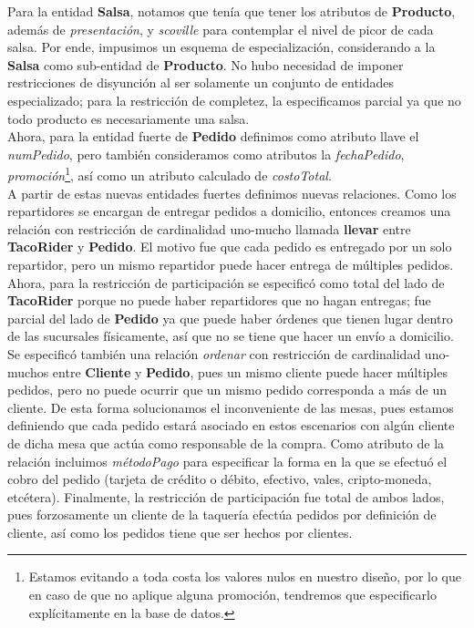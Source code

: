 \documentclass[11pt,letterpaper]{article}
\begin{document}
Para la entidad \textbf{Salsa}, notamos que tenía que tener los atributos de \textbf{Producto}, además de \textit{presentación}, y \textit{scoville} para contemplar el nivel de picor de cada salsa. Por ende, impusimos un esquema de especialización, considerando a la \textbf{Salsa} como sub-entidad de \textbf{Producto}. No hubo necesidad de imponer restricciones de disyunción al ser solamente un conjunto de entidades especializado; para la restricción de completez, la especificamos parcial ya que no todo producto es necesariamente una salsa.\\

Ahora, para la entidad fuerte de \textbf{Pedido} definimos como atributo llave el \textit{numPedido}, pero también consideramos como atributos la \textit{fechaPedido}, \textit{promoción}\footnote{Estamos evitando a toda costa los valores nulos en nuestro diseño, por lo que en caso de que no aplique alguna promoción, tendremos que especificarlo explícitamente en la base de datos.}, así como un atributo calculado de \textit{costoTotal}. \\

A partir de estas nuevas entidades fuertes definimos nuevas relaciones. Como los repartidores se encargan de entregar pedidos a domicilio, entonces creamos una relación con restricción de cardinalidad uno-mucho llamada \textbf{llevar} entre \textbf{TacoRider} y \textbf{Pedido}. El motivo fue que cada pedido es entregado por un solo repartidor, pero un mismo repartidor puede hacer entrega de múltiples pedidos. Ahora, para la restricción de participación se especificó como total del lado de \textbf{TacoRider} porque no puede haber repartidores que no hagan entregas; fue parcial del lado de \textbf{Pedido} ya que puede haber órdenes que tienen lugar dentro de las sucursales físicamente, así que no se tiene que hacer un envío a domicilio.\\

Se especificó también una relación \textit{ordenar} con restricción de cardinalidad uno-muchos entre \textbf{Cliente} y \textbf{Pedido}, pues un mismo cliente puede hacer múltiples pedidos, pero no puede ocurrir que un mismo pedido corresponda a más de un cliente. De esta forma solucionamos el inconveniente de las mesas, pues estamos definiendo que cada pedido estará asociado en estos escenarios con algún cliente de dicha mesa que actúa como responsable de la compra. Como atributo de la relación incluimos \textit{métodoPago} para especificar la forma en la que se efectuó el cobro del pedido (tarjeta de crédito o débito, efectivo, vales, cripto-moneda, etcétera). Finalmente, la restricción de participación fue total de ambos lados, pues forzosamente un cliente de la taquería efectúa pedidos por definición de cliente, así como los pedidos tiene que ser hechos por clientes.\\
\end{document}
